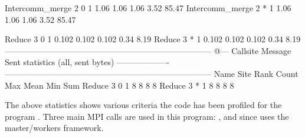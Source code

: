 \begin{Output}
Intercomm_merge      2    0      1     1.06     1.06     1.06   3.52  85.47
Intercomm_merge      2    *      1     1.06     1.06     1.06   3.52  85.47

Reduce               3    0      1    0.102    0.102    0.102   0.34   8.19
Reduce               3    *      1    0.102    0.102    0.102   0.34   8.19
---------------------------------------------------------------------------
@--- Callsite Message Sent statistics (all, sent bytes) -------------------
---------------------------------------------------------------------------
Name              Site Rank   Count       Max      Mean       Min       Sum
Reduce               3    0       1         8         8         8         8
Reduce               3    *       1         8         8         8         8
\end{Output}

The above statistics shows various criteria the code has been profiled for the
program . Three main MPI calls are used in this program:
,  and 
since  uses the master/workers framework.


